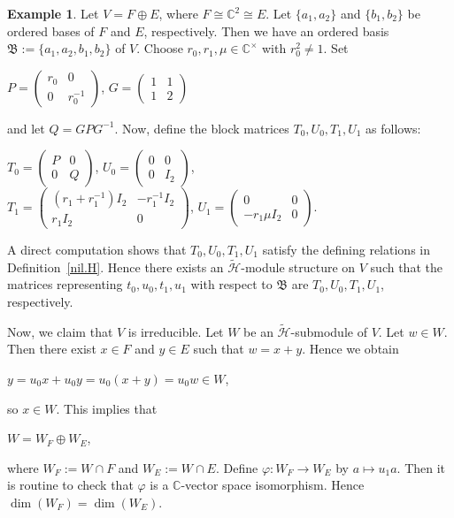 \documentclass[reqno]{amsart}
\theoremstyle{definition}
\newtheorem{example}[theorem]{Example}
\begin{document}
\begin{example}
%
{\rm
Let $V = F \oplus E$,
where $F\cong \mathbb{C}^2 \cong E$.
Let $\{a_1,a_2\}$ and $\{b_1,b_2\}$ be ordered bases of $F$ and $E$, respectively.
Then we have an ordered basis $\mathfrak{B}:=\{a_1,a_2,b_1,b_2\}$ of $V$.
Choose $r_0,r_1, \mu \in \mathbb{C}^{\times}$ with $r_0^2 \neq 1$.
Set 
\begin{center}
$P=\begin{pmatrix}r_0&0\\0&r_0^{-1}\end{pmatrix}$, \quad
$G=\begin{pmatrix}1&1\\1&2\end{pmatrix}$
\end{center}
and let $Q=GPG^{-1}$.
Now, define the block matrices
$T_0,U_0,T_1,U_1$ as follows:
\begin{center}
$T_0 = \begin{pmatrix}P&0\\0&Q\end{pmatrix}$, \quad
$U_0 = \begin{pmatrix}0&0\\0&I_2\end{pmatrix}$,\\[5pt]
$T_1 = \begin{pmatrix}(r_1+r_1^{-1})I_2&-r_1^{-1}I_2\\ r_1I_2&0\end{pmatrix}$, \quad
$U_1 = \begin{pmatrix}0&0\\-r_1\mu I_2&0\end{pmatrix}$.
\end{center}
A direct computation shows that
$T_0,U_0,T_1,U_1$ satisfy the defining relations in
Definition~\ref{nil.H}.
Hence there exists an $\widetilde{\mathcal{H}}$-module structure on $V$ such that
the matrices representing $t_0,u_0,t_1,u_1$ with respect to $\mathfrak{B}$
are $T_0,U_0,T_1,U_1$, respectively.

Now, we claim that $V$ is irreducible.
Let $W$ be an $\widetilde{\mathcal{H}}$-submodule of $V$.
Let $w \in W$.
Then there exist $x \in F$ and $y \in E$ such that
$w = x+y$.
Hence we obtain
\begin{center}
$y = u_0x + u_0 y = u_0 (x+y) = u_0w \in W$,
\end{center}
so $x \in W$.
This implies that
\begin{center}
$W= W_F \oplus W_E$,
\end{center}
where $W_F := W \cap F$ and $W_E := W \cap E$.
Define $\varphi: W_F \to W_E$ by $a \mapsto u_1a$.
Then it is routine to check that $\varphi$ is a $\mathbb{C}$-vector space isomorphism.
Hence $\dim(W_F) = \dim(W_E)$.

}
\end{example}
\end{document}
